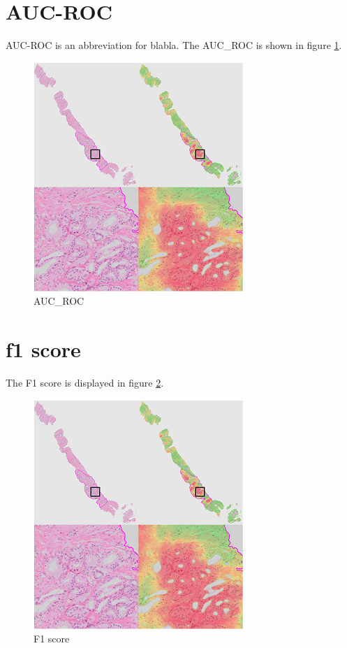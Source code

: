 \section{AUC-ROC}
AUC-ROC is an abbreviation for blabla.
The AUC\_ROC is shown in figure \ref{chart:auc_roc}.

\begin{figure}
	\centering
	\includegraphics[scale=0.5]{images/CHANGE_THIS.png}
	\caption{AUC\_ROC}
	\label{chart:auc_roc}
\end{figure}

\section{f1 score}
The F1 score is displayed in figure \ref{chart:f1_score}.

\begin{figure}
	\centering
	\includegraphics[scale=0.5]{images/CHANGE_THIS.png}
	\caption{F1 score}
	\label{chart:f1_score}
\end{figure}

